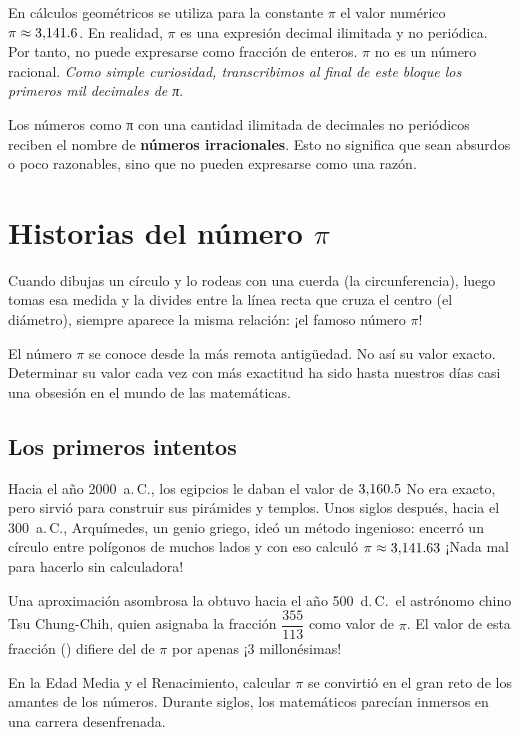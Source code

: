 {En cálculos geométricos se utiliza para la constante $\pi$  el valor numérico $\pi \approx \numes{3.1416}$.
En realidad, $\pi$ es una expresión decimal ilimitada y no periódica. Por tanto,
no puede expresarse como fracción de enteros. $\pi$ no es un número racional. \textit{Como simple curiosidad, 
transcribimos al final de este bloque los primeros mil decimales de π}.

Los números como π con una cantidad ilimitada de decimales no periódicos reciben el nombre de \textbf{números irracionales}. 
Esto no significa que sean absurdos o poco razonables, sino que no pueden expresarse como una razón.

\section*{Historias del número \texorpdfstring{$\pi$}{pi}}
Cuando dibujas un círculo y lo rodeas con una cuerda (la circunferencia), luego tomas esa medida y la divides 
entre la línea recta que cruza el centro (el diámetro), siempre aparece la misma relación: ¡el famoso número $\pi$!

El número $\pi$ se conoce desde la más remota antigüedad. No así su valor exacto. Determinar su valor cada vez 
con más exactitud ha sido hasta nuestros días casi una obsesión en el mundo de las matemáticas.

\subsection*{Los primeros intentos}
Hacia el año 2000~a.\,C., los egipcios le daban el valor de $\numes{3.1605}$ 
No era exacto, pero sirvió para construir sus pirámides y templos. Unos siglos después, hacia el 300~a.\,C., 
Arquímedes, un genio griego, ideó un método ingenioso: encerró un círculo entre polígonos de muchos lados 
y con eso calculó $\pi \approx \numes{3.14163}$ ¡Nada mal para hacerlo sin calculadora!

Una aproximación asombrosa la obtuvo hacia el año 500~d.\,C.\ el astrónomo chino 
Tsu Ch\textquotesingle ung-Chih, quien asignaba la fracción $\dfrac{355}{113}$ como valor de $\pi$. 
El valor de esta fracción () difiere del de $\pi$ por apenas ¡3 millonésimas!

En la Edad Media y el Renacimiento, calcular $\pi$ se convirtió en el gran reto de los amantes 
de los números. Durante siglos, los matemáticos parecían inmersos en una carrera desenfrenada.

}
